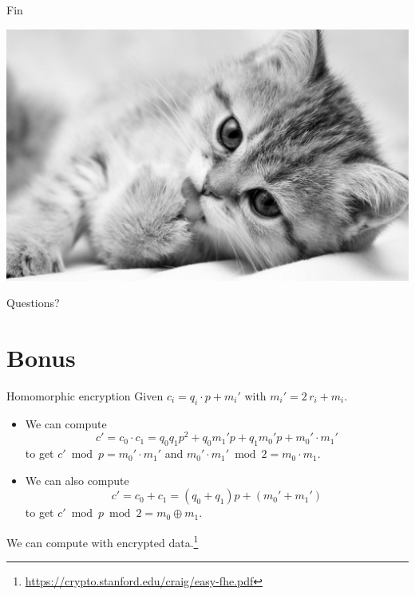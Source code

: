 \documentclass[presentation,smaller]{beamer}
\begin{document}
\begin{frame}[standout,label={sec:orgff646ac}]{Fin}
\begin{center}
\begin{center}
\includegraphics[width=.9\linewidth]{./kitten-01.jpg}
\end{center}

\alert{\Large Questions?}
\end{center}
\end{frame}

\section{Bonus}
\label{sec:org57bb053}

\begin{frame}[label={sec:orgc88c16d}]{Homomorphic encryption}
Given \(c_i = q_i ⋅ p + m_i'\) with \(m_i' = 2\,r_i + m_i\).
\begin{itemize}
\item We can compute \[c' = c_0 ⋅ c_1 = q_0 q_1 p^2 + q_0 m_1' p  + q_1 m_0' p + m_0' ⋅ m_1'\] to get \(c' \bmod p =  m_0' ⋅ m_1'\) and \(m_0' ⋅ m_1' \bmod 2 = m_0 ⋅ m_1\).
\item We can also compute \[c' = c_0 + c_1 = (q_0 + q_1) p + (m_0' + m_1')\] to get \(c' \bmod p \bmod 2 = m_0 \oplus m_1\).
\end{itemize}

We can compute with encrypted data.\footnote{\url{https://crypto.stanford.edu/craig/easy-fhe.pdf}}
\end{frame}
\end{document}
